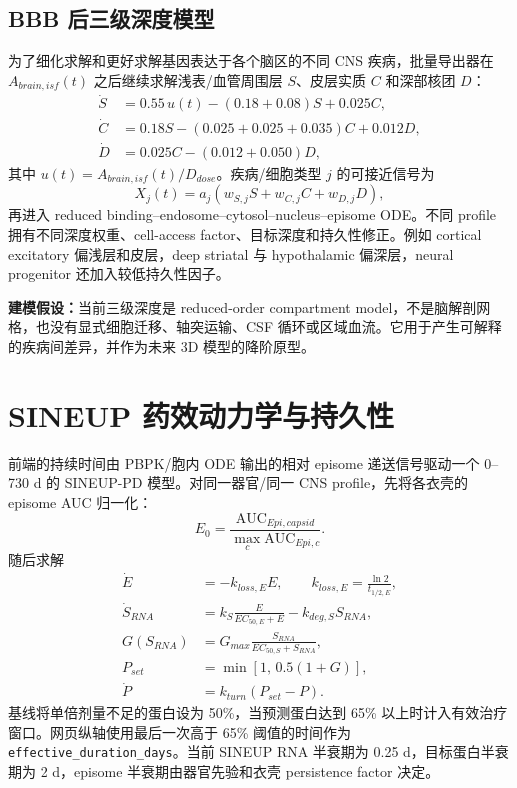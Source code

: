 \documentclass[UTF8,11pt,a4paper]{ctexart}
\newcommand{\AUC}{\mathrm{AUC}}
\newcommand{\code}[1]{\texttt{#1}}
\newcommand{\assumption}[1]{\textcolor{warning}{\textbf{建模假设：}#1}}
\begin{document}
\subsection{BBB 后三级深度模型}
为了细化求解和更好求解基因表达于各个脑区的不同 CNS 疾病，批量导出器在 $A_{brain,isf}(t)$ 之后继续求解浅表/血管周围层 $S$、皮层实质 $C$ 和深部核团 $D$：
\begin{align}
\dot S &=0.55\,u(t)-(0.18+0.08)S+0.025C,\\
\dot C &=0.18S-(0.025+0.025+0.035)C+0.012D,\\
\dot D &=0.025C-(0.012+0.050)D,
\end{align}
其中 $u(t)=A_{brain,isf}(t)/D_{dose}$。疾病/细胞类型 $j$ 的可接近信号为
\begin{equation}
X_j(t)=a_j\left(w_{S,j}S+w_{C,j}C+w_{D,j}D\right),
\end{equation}
再进入 reduced binding--endosome--cytosol--nucleus--episome ODE。不同 profile 拥有不同深度权重、cell-access factor、目标深度和持久性修正。例如 cortical excitatory 偏浅层和皮层，deep striatal 与 hypothalamic 偏深层，neural progenitor 还加入较低持久性因子。

\assumption{当前三级深度是 reduced-order compartment model，不是脑解剖网格，也没有显式细胞迁移、轴突运输、CSF 循环或区域血流。它用于产生可解释的疾病间差异，并作为未来 3D 模型的降阶原型。}

\section{SINEUP 药效动力学与持久性}

前端的持续时间由 PBPK/胞内 ODE 输出的相对 episome 递送信号驱动一个 0--730 d 的 SINEUP-PD 模型。对同一器官/同一 CNS profile，先将各衣壳的 episome AUC 归一化：
\begin{equation}
E_0=\frac{\AUC_{Epi,capsid}}{\max_c\AUC_{Epi,c}}.
\end{equation}
随后求解
\begin{align}
\dot E &=-k_{loss,E}E,\qquad k_{loss,E}=\frac{\ln2}{t_{1/2,E}},\\
\dot S_{RNA}&=k_{S}\frac{E}{EC_{50,E}+E}-k_{deg,S}S_{RNA},\\
G(S_{RNA})&=G_{max}\frac{S_{RNA}}{EC_{50,S}+S_{RNA}},\\
P_{set}&=\min\left[1,\,0.5(1+G)\right],\\
\dot P&=k_{turn}(P_{set}-P).
\end{align}
基线将单倍剂量不足的蛋白设为 50\%，当预测蛋白达到 65\% 以上时计入有效治疗窗口。网页纵轴使用最后一次高于 65\% 阈值的时间作为 \code{effective\_duration\_days}。当前 SINEUP RNA 半衰期为 0.25 d，目标蛋白半衰期为 2 d，episome 半衰期由器官先验和衣壳 persistence factor 决定。
\end{document}
